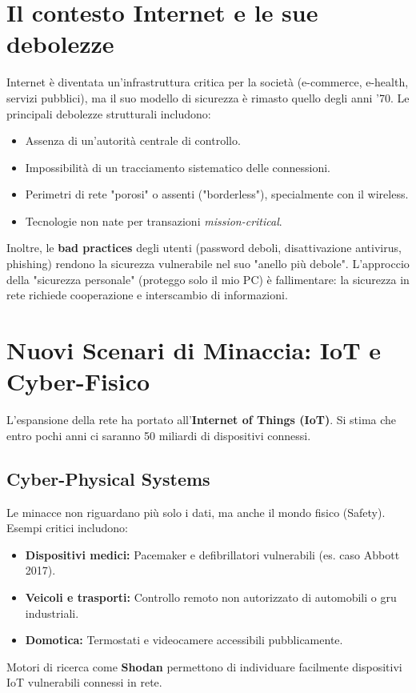\documentclass[a4paper,12pt]{article}
\begin{document}
\section{Il contesto Internet e le sue debolezze}

Internet è diventata un'infrastruttura critica per la società (e-commerce, e-health, servizi pubblici), ma il suo modello di sicurezza è rimasto quello degli anni '70. 
Le principali debolezze strutturali includono:
\begin{itemize}
    \item Assenza di un'autorità centrale di controllo.
    \item Impossibilità di un tracciamento sistematico delle connessioni.
    \item Perimetri di rete "porosi" o assenti ("borderless"), specialmente con il wireless.
    \item Tecnologie non nate per transazioni \textit{mission-critical}.
\end{itemize}

Inoltre, le \textbf{bad practices} degli utenti (password deboli, disattivazione antivirus, phishing) rendono la sicurezza vulnerabile nel suo "anello più debole". L'approccio della "sicurezza personale" (proteggo solo il mio PC) è fallimentare: la sicurezza in rete richiede cooperazione e interscambio di informazioni.

\section{Nuovi Scenari di Minaccia: IoT e Cyber-Fisico}

L'espansione della rete ha portato all'\textbf{Internet of Things (IoT)}. Si stima che entro pochi anni ci saranno 50 miliardi di dispositivi connessi.

\subsection{Cyber-Physical Systems}
Le minacce non riguardano più solo i dati, ma anche il mondo fisico (Safety). Esempi critici includono:
\begin{itemize}
    \item \textbf{Dispositivi medici:} Pacemaker e defibrillatori vulnerabili (es. caso Abbott 2017).
    \item \textbf{Veicoli e trasporti:} Controllo remoto non autorizzato di automobili o gru industriali.
    \item \textbf{Domotica:} Termostati e videocamere accessibili pubblicamente.
\end{itemize}
Motori di ricerca come \textbf{Shodan} permettono di individuare facilmente dispositivi IoT vulnerabili connessi in rete.
\end{document}
